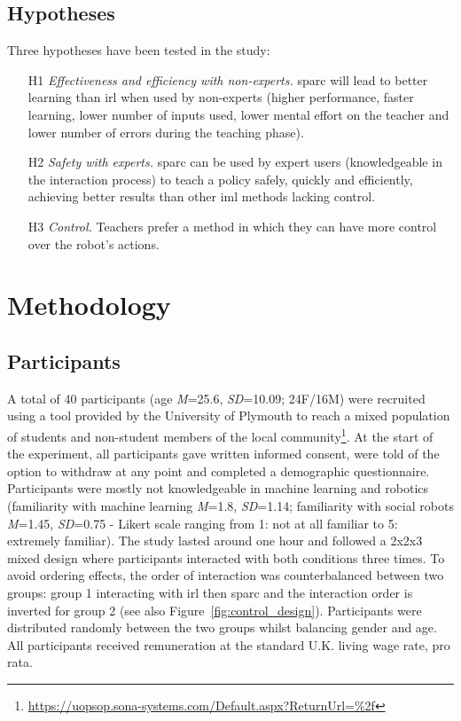 \subsection{Hypotheses}

Three hypotheses have been tested in the study:

\begin{enumerate}
	\item [H1] \textit{Effectiveness and efficiency with non-experts.} \gls{sparc} will lead to better learning than \gls{irl} when used by non-experts (higher performance, faster learning, lower number of inputs used, lower mental effort on the teacher and lower number of errors during the teaching phase). %
	\item [H2] \textit{Safety with experts.} \gls{sparc} can be used by expert users (knowledgeable in the interaction process) to teach a policy safely, quickly and efficiently, achieving better results than other \gls{iml} methods lacking control.
	\item [H3] \textit{Control.} Teachers prefer a method in which they can have more control over the robot's actions.
\end{enumerate}
\section{Methodology}
\subsection{Participants}

A total of 40 participants (age \textit{M}=25.6, \textit{SD}=10.09; 24F/16M) were recruited using a tool provided by the University of Plymouth to reach a mixed population of students and non-student members of the local community\footnote{\url{https://uopsop.sona-systems.com/Default.aspx?ReturnUrl=\%2f}}. At the start of the experiment, all participants gave written informed consent, were told of the option to withdraw at any point and completed a demographic questionnaire. Participants were mostly not knowledgeable in machine learning and robotics (familiarity with machine learning \textit{M}=1.8, \textit{SD}=1.14; familiarity with social robots \textit{M}=1.45, \textit{SD}=0.75 - Likert scale ranging from 1: not at all familiar to 5: extremely familiar). The study lasted around one hour and followed a 2x2x3 mixed design where participants interacted with both conditions three times. To avoid ordering effects, the order of interaction was counterbalanced between two groups: group 1 interacting with \gls{irl} then \gls{sparc} and the interaction order is inverted for group 2 (see also Figure~\ref{fig:control_design}). Participants were distributed randomly between the two groups whilst balancing gender and age. All participants received remuneration at the standard U.K. living wage rate, pro rata. 

